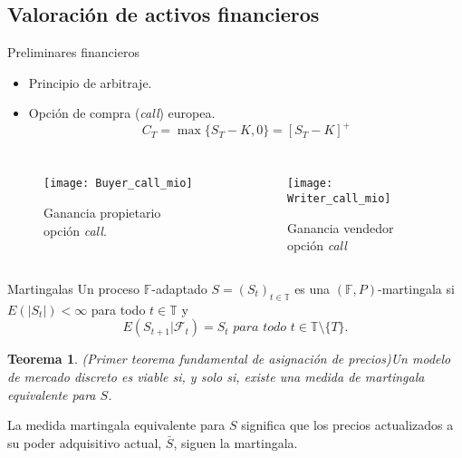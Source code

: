 \documentclass[9pt]{beamer}
\newtheorem{teorema}{Teorema}
\begin{document}
	\subsection{Valoración de activos financieros}
	\begin{frame}{Preliminares financieros}
		\begin{itemize}
			 \item Principio de arbitraje.
			 \item Opción de compra (\textit{call}) europea.
			 \[
			 C_T = \max\{S_T-K, 0\} = \left[S_T - K\right]^+
			 \] 
		\end{itemize}
		\begin{columns}
			\begin{figure}[h!]
				\texttt{[image: Buyer\_call\_mio]}
				\caption{Ganancia propietario opción \textit{call}.}
			\end{figure}
			\begin{figure}[h!]
				\texttt{[image: Writer\_call\_mio]}
				\caption{Ganancia vendedor opción \textit{call}}
			\end{figure} 
		\end{columns}
	
	\end{frame}

	\begin{frame}{Martingalas}
		Un proceso $ \mathbb{F} $-adaptado $ S = (S_t)_{t\in \mathbb{T}} $ es una $ ( \mathbb{F},P)$-mar\-tingala si $ E(|S_t|) < \infty $ para todo $ t \in \mathbb{T} $ y 
		\[
		E(S_{t+1}|\mathcal{F}_t) = S_t \textit{ para todo } t \in \mathbb{T}\setminus\{T\}.
		\]
		\begin{teorema}(Primer teorema fundamental de asignación de precios)\label{VIABLEiofEMM}
			Un modelo de mercado discreto es viable si, y solo si, existe una medida de martingala equivalente para $ S $.
		\end{teorema}
	
		La medida martingala equivalente para $ S $ significa que los precios actualizados a su poder adquisitivo actual, $ \bar{S} $, siguen la martingala.
	\end{frame}
	
\end{document}
